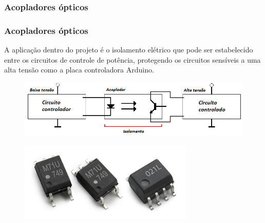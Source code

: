 \subsubsection{Acopladores ópticos}

\begin{frame}
\frametitle{Acopladores ópticos}

A aplicação dentro do projeto é o isolamento elétrico que pode ser estabelecido entre os circuitos de controle de potência, protegendo os circuitos sensíveis a uma alta tensão como a placa controladora Arduino.

\begin{figure}
\centering
\includegraphics[scale = 0.4]{figuras/acoplador}
\end{figure}

\begin{figure}
\centering
\includegraphics[scale = 0.4]{figuras/fotoacoplador}
\end{figure}

\end{frame}
